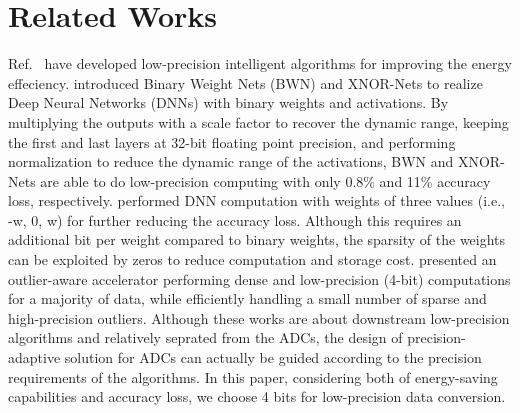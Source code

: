 \section{Related Works}\label{related}

Ref.~\cite{leibe_xnor-net_2016} \cite{li_ternary_2016}\cite{park_energy-efficient_2018} have developed low-precision intelligent algorithms for improving the energy effeciency. \cite{leibe_xnor-net_2016} introduced Binary Weight Nets (BWN) and XNOR-Nets to realize
Deep Neural Networks (DNNs) with binary weights and activations. 
By multiplying the outputs with a scale factor to recover the dynamic range, keeping the first and last layers at 32-bit floating point precision, and performing normalization to reduce the dynamic range of the activations,
BWN and XNOR-Nets are able to do low-precision computing with only 0.8\% and 11\% accuracy loss, respectively.\cite{li_ternary_2016} performed DNN computation with weights of three values (i.e., -w, 0, w) for further reducing the accuracy loss. Although this requires an additional bit per weight compared to binary weights, the sparsity of the weights can be exploited by zeros to reduce computation and storage cost.\cite{park_energy-efficient_2018} presented an outlier-aware accelerator performing dense and low-precision (4-bit) computations for a majority of data, while efficiently handling a small number of sparse and high-precision outliers.
Although these works are about  downstream low-precision algorithms and relatively seprated from the ADCs, the design of precision-adaptive solution for ADCs can actually be guided according to the precision requirements of the algorithms. In this paper, considering both of energy-saving capabilities and accuracy loss, we choose 4 bits for low-precision data conversion.


